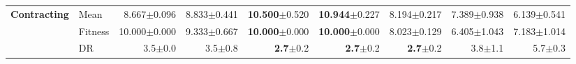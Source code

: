 \begin{table}[htbp]
{\begin{tabular}{ll||r|rrrrrr}
\midrule
\multirow{3}{*}{\textbf{Contracting}} & Mean & \cellcolor[HTML]{F8E4B8} 8.667{\scriptsize\color{black!60}$\pm$0.096} & 8.833{\scriptsize\color{black!60}$\pm$0.441} & \textbf{10.500}{\scriptsize\color{black!60}$\pm$0.520} & \textbf{10.944}{\scriptsize\color{black!60}$\pm$0.227} & 8.194{\scriptsize\color{black!60}$\pm$0.217} & \textcolor{black!60}{7.389}{\scriptsize\color{black!60}$\pm$0.938} & \textcolor{black!60}{6.139}{\scriptsize\color{black!60}$\pm$0.541} \\
 & Fitness & \cellcolor[HTML]{F2CF80} 10.000{\scriptsize\color{black!60}$\pm$0.000} & 9.333{\scriptsize\color{black!60}$\pm$0.667} & \textbf{10.000}{\scriptsize\color{black!60}$\pm$0.000} & \textbf{10.000}{\scriptsize\color{black!60}$\pm$0.000} & 8.023{\scriptsize\color{black!60}$\pm$0.129} & \textcolor{black!60}{6.405}{\scriptsize\color{black!60}$\pm$1.043} & \textcolor{black!60}{7.183}{\scriptsize\color{black!60}$\pm$1.014} \\
 & DR & 3.5{\scriptsize\color{black!60}$\pm$0.0} & 3.5{\scriptsize\color{black!60}$\pm$0.8} & \textbf{2.7}{\scriptsize\color{black!60}$\pm$0.2} & \textbf{2.7}{\scriptsize\color{black!60}$\pm$0.2} & \textbf{2.7}{\scriptsize\color{black!60}$\pm$0.2} & \textcolor{black!60}{3.8}{\scriptsize\color{black!60}$\pm$1.1} & \textcolor{black!60}{5.7}{\scriptsize\color{black!60}$\pm$0.3} \\
\bottomrule
\end{tabular}
}
\end{table}

